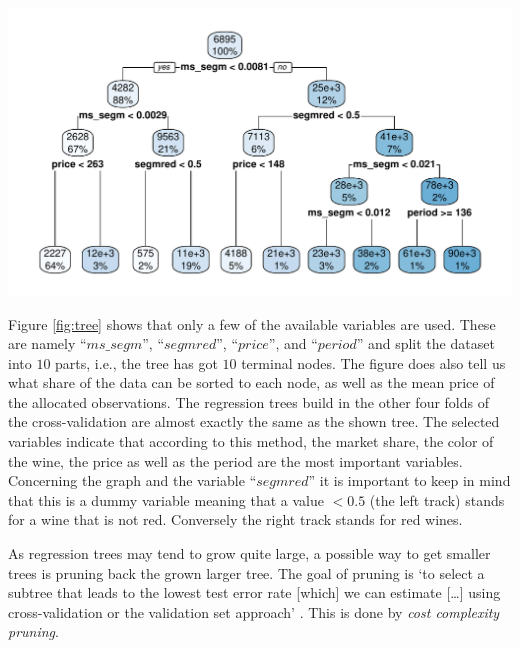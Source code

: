 \documentclass[11pt,]{article}
\let\origfigure\figure
\let\endorigfigure\endfigure
\renewenvironment{figure}[1][2] {
    \expandafter\origfigure\expandafter[H]
} {
    \endorigfigure
}
\begin{document}
\begin{figure}
\centering
\includegraphics{../00_data/output_paper/09_tree.pdf}
\caption{\label{fig:tree}Example of a Regression Tree.}
\end{figure}

Figure \ref{fig:tree} shows that only a few of the available variables
are used. These are namely \enquote{\(ms\_segm\)},
\enquote{\(segmred\)}, \enquote{\(price\)}, and \enquote{\(period\)} and
split the dataset into \(10\) parts, i.e., the tree has got \(10\)
terminal nodes. The figure does also tell us what share of the data can
be sorted to each node, as well as the mean price of the allocated
observations. The regression trees build in the other four folds of the
cross-validation are almost exactly the same as the shown tree. The
selected variables indicate that according to this method, the market
share, the color of the wine, the price as well as the period are the
most important variables. Concerning the graph and the variable
\enquote{\(segmred\)} it is important to keep in mind that this is a
dummy variable meaning that a value \(< 0.5\) (the left track) stands
for a wine that is not red. Conversely the right track stands for red
wines.

As regression trees may tend to grow quite large, a possible way to get
smaller trees is pruning back the grown larger tree. The goal of pruning
is `to select a subtree that leads to the lowest test error rate
{[}which{]} we can estimate {[}\ldots{}{]} using cross-validation or the
validation set approach' \autocite[][p. 308]{James2014}. This is done by
\emph{cost complexity pruning}.
\end{document}
